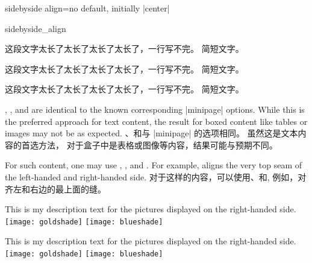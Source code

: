 \begin{docTcbKey}[][doc updated=2015-02-06]{sidebyside align}{=}{no default, initially |center|}
\begin{exdispExample}{sidebyside_align}
\begin{tcolorbox}[adjusted title=center,sidebyside align=center]
这段文字太长了太长了太长了太长了，一行写不完。
\tcblower
简短文字。
\end{tcolorbox}\hfill
\begin{tcolorbox}[adjusted title=top,sidebyside align=top]
这段文字太长了太长了太长了太长了，一行写不完。
\tcblower
简短文字。
\end{tcolorbox}\hfill
\begin{tcolorbox}[adjusted title=bottom,sidebyside align=bottom]
这段文字太长了太长了太长了太长了，一行写不完。
\tcblower
简短文字。
\end{tcolorbox}
\end{exdispExample}


\begin{stripedbox}
, , and  are identical
to the known corresponding |minipage| options.
While this is the preferred approach for text content, the result for
boxed content like tables or images may not be as expected.
\tcblower
{}、和与 |minipage| 的选项相同。%
虽然这是文本内容的首选方法，%
对于盒子中是表格或图像等内容，结果可能与预期不同。
\end{stripedbox}

\begin{stripedbox}
For such content, one may use , ,
and . For example,  aligns
the very top seam of the left-handed and right-handed side.
\tcblower
对于这样的内容，可以使用、和,
例如，对齐左和右边的最上面的缝。
\end{stripedbox}

\begin{dispExample}

\begin{tcolorbox}[adjusted title=center seam,sidebyside align=center seam]
This is my description text for the pictures displayed on the right-handed side.
\tcblower
\texttt{[image: goldshade]}%
\texttt{[image: blueshade]}
\end{tcolorbox}

\begin{tcolorbox}[adjusted title=top seam,sidebyside align=top seam]
  This is my description text for the pictures displayed on the right-handed side.
  \tcblower
  \texttt{[image: goldshade]}%
  \texttt{[image: blueshade]}
\end{tcolorbox}


\end{dispExample}
\end{docTcbKey}
